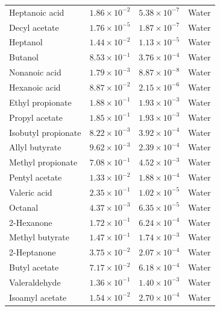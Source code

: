 \documentclass[%
 twocolumn,
 amsmath,amssymb,
 aps,prfluids,
 superscriptaddress,
]{revtex4-2}
\begin{document}
\begin{table}[t]
\begin{ruledtabular}
\begin{tabular}{l c c c}
Heptanoic acid       & $1.86\times 10^{-2}$  & $5.38\times 10^{-7}$ & Water \\
Decyl acetate        & $1.76\times 10^{-5}$  & $1.87\times 10^{-7}$ & Water \\
Heptanol             & $1.44\times 10^{-2}$  & $1.13\times 10^{-5}$ & Water \\
Butanol              & $8.53\times 10^{-1}$  & $3.76\times 10^{-4}$ & Water \\
Nonanoic acid        & $1.79\times 10^{-3}$  & $8.87\times 10^{-8}$ & Water \\
Hexanoic acid        & $8.87\times 10^{-2}$  & $2.15\times 10^{-6}$ & Water \\
Ethyl propionate     & $1.88\times 10^{-1}$  & $1.93\times 10^{-3}$ & Water \\
Propyl acetate       & $1.85\times 10^{-1}$  & $1.93\times 10^{-3}$ & Water \\
Isobutyl propionate  & $8.22\times 10^{-3}$  & $3.92\times 10^{-4}$ & Water \\
Allyl butyrate       & $9.62\times 10^{-3}$  & $2.39\times 10^{-4}$ & Water \\
Methyl propionate    & $7.08\times 10^{-1}$  & $4.52\times 10^{-3}$ & Water \\
Pentyl acetate       & $1.33\times 10^{-2}$  & $1.88\times 10^{-4}$ & Water \\
Valeric acid         & $2.35\times 10^{-1}$  & $1.02\times 10^{-5}$ & Water \\
Octanal              & $4.37\times 10^{-3}$  & $6.35\times 10^{-5}$ & Water   \\
2-Hexanone           & $1.72\times 10^{-1}$  & $6.24\times 10^{-4}$ & Water \\
Methyl butyrate      & $1.47\times 10^{-1}$  & $1.74\times 10^{-3}$ & Water \\
2-Heptanone          & $3.75\times 10^{-2}$  & $2.07\times 10^{-4}$ & Water \\
Butyl acetate        & $7.17\times 10^{-2}$  & $6.18\times 10^{-4}$ & Water \\
Valeraldehyde        & $1.36\times 10^{-1}$  & $1.40\times 10^{-3}$ & Water \\
Isoamyl acetate      & $1.54\times 10^{-2}$  & $2.70\times 10^{-4}$ & Water \\
\end{tabular}
\end{ruledtabular}
\end{table}
\end{document}
